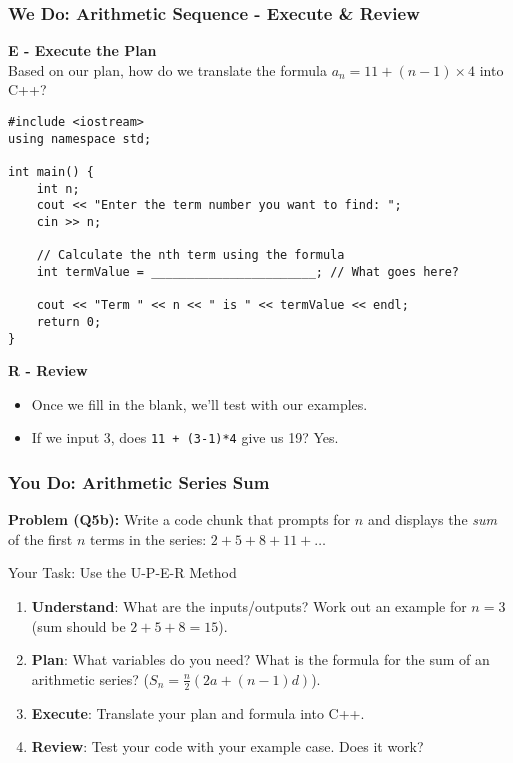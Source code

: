\documentclass{beamer}
\begin{document}
\begin{frame}[fragile]
\frametitle{We Do: Arithmetic Sequence - Execute \& Review}
\textbf{E - Execute the Plan} \\
Based on our plan, how do we translate the formula $a_n = 11 + (n-1) \times 4$ into C++?

\begin{verbatim}
#include <iostream>
using namespace std;

int main() {
    int n;
    cout << "Enter the term number you want to find: ";
    cin >> n;

    // Calculate the nth term using the formula
    int termValue = _______________________; // What goes here?

    cout << "Term " << n << " is " << termValue << endl;
    return 0;
}
\end{verbatim}
\pause
\textbf{R - Review}
\begin{itemize}
    \item Once we fill in the blank, we'll test with our examples.
    \item If we input 3, does \texttt{11 + (3-1)*4} give us 19? Yes.
\end{itemize}
\end{frame}

\begin{frame}
\frametitle{You Do: Arithmetic Series Sum}
\textbf{Problem (Q5b):} Write a code chunk that prompts for $n$ and displays the \textit{sum} of the first $n$ terms in the series: $2 + 5 + 8 + 11 + \dots$

\vspace{1em}
\begin{alertblock}{Your Task: Use the U-P-E-R Method}
\begin{enumerate}
    \item \textbf{Understand}: What are the inputs/outputs? Work out an example for $n=3$ (sum should be $2+5+8=15$).
    \item \textbf{Plan}: What variables do you need? What is the formula for the sum of an arithmetic series? ($S_n = \frac{n}{2}(2a + (n-1)d)$).
    \item \textbf{Execute}: Translate your plan and formula into C++.
    \item \textbf{Review}: Test your code with your example case. Does it work?
\end{enumerate}
\end{alertblock}
\end{frame}
\end{document}
